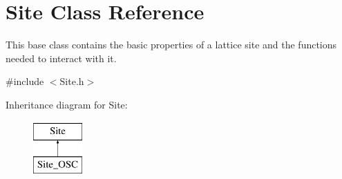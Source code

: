 \hypertarget{class_site}{}\section{Site Class Reference}
\label{class_site}


This base class contains the basic properties of a lattice site and the functions needed to interact with it.  




{\ttfamily \#include $<$Site.\+h$>$}

Inheritance diagram for Site\+:\begin{figure}[H]
\begin{center}
\leavevmode
\includegraphics[height=2.000000cm]{class_site}
\end{center}
\end{figure}
